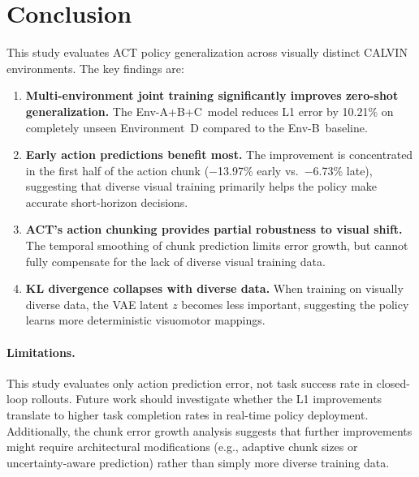 \documentclass[twoside,twocolumn,10pt]{article}
\newcommand{\dataset}{CALVIN}
\newcommand{\envB}{B}
\newcommand{\envABC}{A+B+C}
\newcommand{\envD}{D}
\begin{document}
\section{Conclusion}

This study evaluates ACT policy generalization across visually distinct
\dataset{} environments.  The key findings are:

\begin{enumerate}[nosep]
  \item \textbf{Multi-environment joint training significantly improves
        zero-shot generalization.}  The Env-\envABC~model reduces L1 error by
        10.21\% on completely unseen Environment~\envD{} compared to the
        Env-\envB~baseline.
  \item \textbf{Early action predictions benefit most.}  The improvement is
        concentrated in the first half of the action chunk ($-$13.97\% early
        vs.~$-$6.73\% late), suggesting that diverse visual training primarily
        helps the policy make accurate short-horizon decisions.
  \item \textbf{ACT's action chunking provides partial robustness to visual
        shift.}  The temporal smoothing of chunk prediction limits error
        growth, but cannot fully compensate for the lack of diverse visual
        training data.
  \item \textbf{KL divergence collapses with diverse data.}  When training on
        visually diverse data, the VAE latent $z$ becomes less important,
        suggesting the policy learns more deterministic visuomotor mappings.
\end{enumerate}

\paragraph{Limitations.}  This study evaluates only action prediction error,
not task success rate in closed-loop rollouts.  Future work should investigate
whether the L1 improvements translate to higher task completion rates in
real-time policy deployment.  Additionally, the chunk error growth analysis
suggests that further improvements might require architectural modifications
(e.g., adaptive chunk sizes or uncertainty-aware prediction) rather than simply
more diverse training data.
\end{document}

